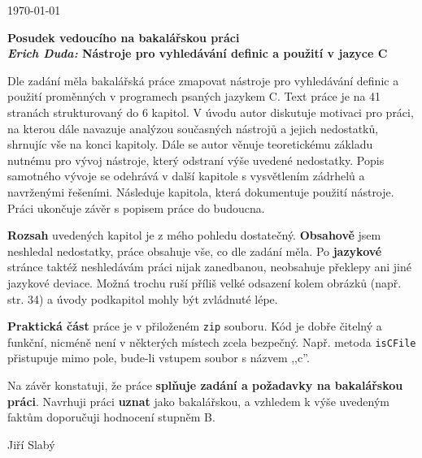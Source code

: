 \documentclass{article}
\begin{document}
\begin{flushright}
\today
\end{flushright}
\begin{center}
\Large\textbf{Posudek vedoucího na bakalářskou práci \\
\normalsize%
\textit{Erich Duda:} Nástroje pro vyhledávání definic a použití v jazyce C}
\end{center}

Dle zadání měla bakalářská práce zmapovat nástroje pro vyhledávání definic a
použití proměnných v programech psaných jazykem C. Text práce je na 41
stranách strukturovaný do 6 kapitol. V úvodu autor diskutuje motivaci pro
práci, na kterou dále navazuje analýzou současných nástrojů a jejich
nedostatků, shrnujíc vše na konci kapitoly. Dále se autor věnuje teoretickému
základu nutnému pro vývoj nástroje, který odstraní výše uvedené nedostatky.
Popis samotného vývoje se odehrává v další kapitole s vysvětlením zádrhelů a
navrženými řešeními. Následuje kapitola, která dokumentuje použití nástroje.
Práci ukončuje závěr s popisem práce do budoucna.

\textbf{Rozsah} uvedených kapitol je z mého pohledu dostatečný.
\textbf{Obsahově} jsem neshledal nedostatky, práce obsahuje vše, co dle zadání
měla. Po \textbf{jazykové} stránce taktéž neshledávám práci nijak zanedbanou,
neobsahuje překlepy ani jiné jazykové deviace. Možná trochu ruší příliš velké
odsazení kolem obrázků (např. str. 34) a úvody podkapitol mohly být zvládnuté
lépe.

\textbf{Praktická část} práce je v přiloženém \texttt{zip} souboru. Kód je
dobře čitelný a funkční, nicméně není v některých místech zcela bezpečný.
Např. metoda \texttt{isCFile} přistupuje mimo pole, bude-li vstupem soubor s
názvem ,,c''.

Na závěr konstatuji, že práce \textbf{splňuje zadání a požadavky na
bakalářskou práci}. Navrhuji práci \textbf{uznat} jako bakalářskou, a vzhledem k
výše uvedeným faktům doporučuji hodnocení stupněm B.

\vspace{3em}
\begin{flushright}
Jiří Slabý
\end{flushright}
\end{document}
